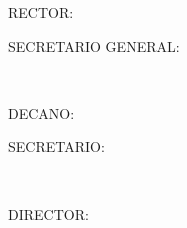 \begingroup
\singlespacing
\thispagestyle{empty}
\begin{center}
\textbf{\MakeUppercase{\UESuniversity}}
\end{center}

\vspace{1.5cm}

\noindent\MakeUppercase{Rector:}\\[0.4cm]
\begin{center}\textbf{\MakeUppercase{\UESrector}}\end{center}

\vspace{1.0cm}

\noindent\MakeUppercase{Secretario General:}\\[0.4cm]
\begin{center}\textbf{\MakeUppercase{\UESsecgral}}\end{center}

\vspace{1.0cm}

\begin{center}
    \noindent\textbf{\MakeUppercase{\UESfaculty}}\\[0.4cm]
\end{center}

\noindent\MakeUppercase{Decano:}\\[0.4cm]
\begin{center}\textbf{\MakeUppercase{\UESdean}}\end{center}

\vspace{1.0cm}

\noindent\MakeUppercase{Secretario:}\\[0.4cm]
\begin{center}\textbf{\MakeUppercase{\UESfacultysec}}\end{center}

\vspace{1.0cm}

\begin{center}
    \noindent\textbf{\MakeUppercase{\UESschool}}\\[0.4cm]
\end{center}
\noindent\MakeUppercase{Director:}\\[0.4cm]
\begin{center}\textbf{\MakeUppercase{\UESdirector}}\end{center}

\clearpage

\endgroup
